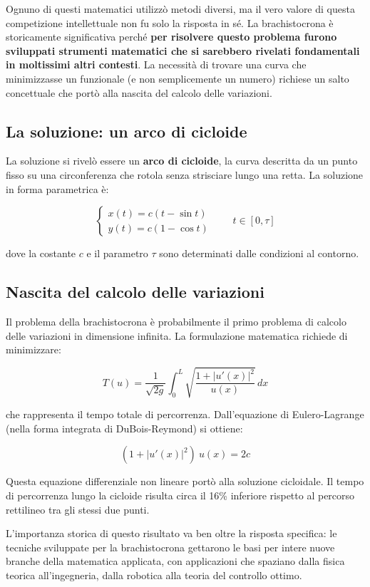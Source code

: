 \documentclass[a4paper,12pt]{article} %
\begin{document}
Ognuno di questi matematici utilizzò metodi diversi, ma il vero valore di questa competizione intellettuale
non fu solo la risposta in sé. La brachistocrona è storicamente significativa perché \textbf{per risolvere
    questo problema furono sviluppati strumenti matematici che si sarebbero rivelati fondamentali in moltissimi
    altri contesti}. La necessità di trovare una curva che minimizzasse un funzionale (e non semplicemente un
numero) richiese un salto concettuale che portò alla nascita del calcolo delle variazioni.

\subsection{La soluzione: un arco di cicloide}

La soluzione si rivelò essere un \textbf{arco di cicloide}, la curva descritta da un punto fisso su una
circonferenza che rotola senza strisciare lungo una retta. La soluzione in forma parametrica è:

\[
    \begin{cases}
        x(t) = c(t - \sin t) \\
        y(t) = c(1 - \cos t)
    \end{cases}
    \qquad t \in [0, \tau]
\]

dove la costante $c$ e il parametro $\tau$ sono determinati dalle condizioni al contorno.

\subsection{Nascita del calcolo delle variazioni}

Il problema della brachistocrona è probabilmente il primo problema di calcolo delle variazioni in
dimensione infinita. La formulazione matematica richiede di minimizzare:

\[
    T(u) = \frac{1}{\sqrt{2g}} \int_{0}^{L} \sqrt{\frac{1 + |u'(x)|^2}{u(x)}} \, dx
\]

che rappresenta il tempo totale di percorrenza. Dall'equazione di Eulero-Lagrange (nella forma integrata
di DuBois-Reymond) si ottiene:

\[
    (1 + |u'(x)|^2) \ u(x) = 2c
\]

Questa equazione differenziale non lineare portò alla soluzione cicloidale. Il tempo di percorrenza lungo
la cicloide risulta circa il 16\% inferiore rispetto al percorso rettilineo tra gli stessi due punti.

L'importanza storica di questo risultato va ben oltre la risposta specifica: le tecniche sviluppate per
la brachistocrona gettarono le basi per intere nuove branche della matematica applicata, con applicazioni
che spaziano dalla fisica teorica all'ingegneria, dalla robotica alla teoria del controllo ottimo.
\end{document}
